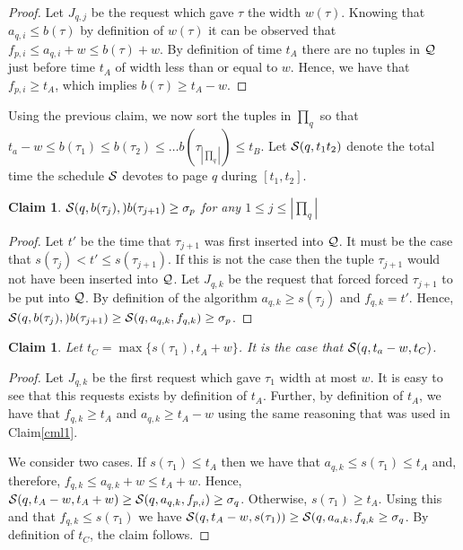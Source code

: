 \documentclass[11pt]{article}
\newtheorem{claim}[lemma]{Claim}
\newcommand{\cS}{{\cal S}}
\newcommand{\cQ}{{\cal Q}}
\begin{document}
\begin{proof}
Let $J_{q,j}$ be the request which gave $\tau$ the width $w(\tau)$. Knowing that $a_{q,i} \leq b(\tau)$ by definition of $w(\tau)$ it can be observed that $f_{p,i} \leq a_{q,i} + w \leq b(\tau) + w$.  By definition of time $t_A$ there are no tuples in $\cQ$ just before time $t_A$ of width less than or equal to $w$.  Hence, we have that $f_{p,i} \geq t_A$, which implies $b(\tau) \geq t_A - w$.
\end{proof}

Using the previous claim, we now sort the tuples in $\prod_q$ so that $t_a - w \leq b(\tau_1) \leq b(\tau_2) \leq \ldots b(\tau_{|\prod_q|})\leq t_B$.  Let $\cS(q,t_1t_2)$ denote the total time the schedule $\cS$ devotes to page $q$ during $[t_1,t_2]$. 










\begin{claim}\label{clm2}
$\cS(q,b(\tau_j),)b(\tau_{j+1}) \geq \sigma_p$ for any $1 \leq j \leq |\prod_q|$
\end{claim}
\begin{proof}
Let $t'$ be the time that $\tau_{j+1}$ was first inserted into $\cQ$.  It must be the case that $s(\tau_j) < t' \leq s(\tau_{j+1})$.  If this is not the case then the tuple $\tau_{j+1}$ would not have been inserted into $\cQ$.  Let $J_{q,k}$ be the request that forced forced $\tau_{j+1}$ to be put into $\cQ$.  By definition of the algorithm $a_{q,k} \geq s(\tau_j)$ and $f_{q,k} =t'$.  Hence, $\cS(q,b(\tau_j),)b(\tau_{j+1}) \geq \cS(q,a_{q,k},f_{q,k}) \geq \sigma_p$.
\end{proof}


\begin{claim}\label{clm3}
Let $t_C = \max \{s(\tau_1), t_A +w \}$.  It is the case that $\cS(q,t_a-w,t_C)$.
\end{claim}
\begin{proof}
Let $J_{q,k}$ be the first request which gave $\tau_1$ width at most $w$.  It is easy to see that this requests exists by definition of $t_A$.  Further, by definition of $t_A$, we have that $f_{q,k} \geq t_A$ and $a_{q,k} \geq t_A -w$ using the same reasoning that was used in Claim\ref{cml1}.  

We consider two cases.  If $s(\tau_1) \leq t_A$ then we have that $a_{q,k} \leq s(\tau_1) \leq t_A$ and, therefore, $f_{q,k} \leq a_{q,k} +w \leq t_A + w$.  Hence, $\cS(q,t_A-w,t_A+w) \geq \cS(q,a_{q,k}, f_{p,i}) \geq \sigma_q$.  Otherwise, $s(\tau_1) \geq t_A$.  Using this and that $f_{q,k} \leq s(\tau_1)$ we have $\cS(q,t_A-w,s(\tau_1)) \geq\cS(q,a_{a,k},f_{q,k} \geq \sigma_q$.  By definition of $t_C$, the claim follows.
\end{proof}
\end{document}
